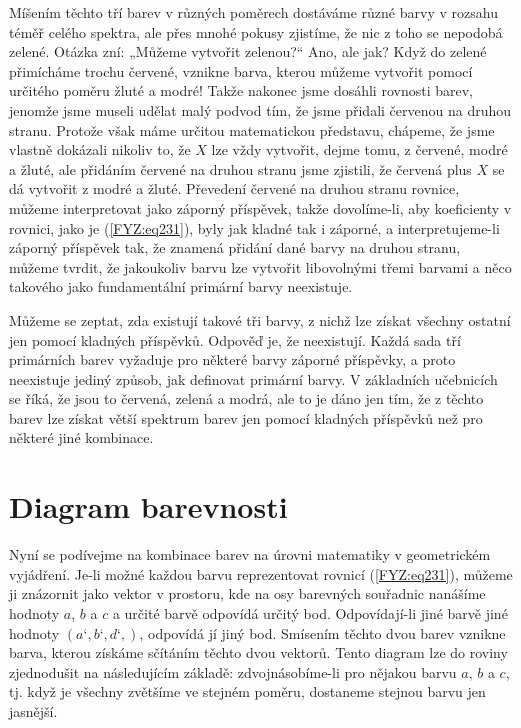     Míšením těchto tří barev v různých poměrech dostáváme různé barvy v rozsahu téměř celého 
    spektra, ale přes mnohé pokusy zjistíme, že nic z toho se nepodobá zelené. Otázka zní: „Můžeme 
    vytvořit zelenou?“ Ano, ale jak? Když do zelené přimícháme trochu červené, vznikne barva, 
    kterou můžeme vytvořit pomocí určitého poměru žluté a modré! Takže nakonec jsme dosáhli 
    rovnosti barev, jenomže jsme museli udělat malý podvod tím, že jsme přidali červenou na druhou 
    stranu. Protože však máme určitou matematickou představu, chápeme, že jsme vlastně dokázali 
    nikoliv to, že \(X\) lze vždy vytvořit, dejme tomu, z červené, modré a žluté, ale přidáním 
    červené na druhou stranu jsme zjistili, že červená plus \(X\) se dá vytvořit z modré a žluté. 
    Převedení červené na druhou stranu rovnice, můžeme interpretovat jako záporný příspěvek, takže 
    dovolíme-li, aby koeficienty v rovnici, jako je (\ref{FYZ:eq231}), byly jak kladné tak i 
    záporné, a interpretujeme-li záporný příspěvek tak, že znamená přidání dané barvy na druhou 
    stranu, můžeme tvrdit, že jakoukoliv barvu lze vytvořit libovolnými třemi barvami a něco 
    takového jako fundamentální primární barvy neexistuje.
    
    Můžeme se zeptat, zda existují takové tři barvy, z nichž lze získat všechny ostatní jen pomocí 
    kladných příspěvků. Odpověď je, že neexistují. Každá sada tří primárních barev vyžaduje pro 
    některé barvy záporné příspěvky, a proto neexistuje jediný způsob, jak definovat primární barvy.
    V základních učebnicích se říká, že jsou to červená, zelená a modrá, ale to je dáno jen tím, že 
    z těchto barev lze získat větší spektrum barev jen pomocí kladných příspěvků než pro některé 
    jiné kombinace.
    
  \section{Diagram barevnosti}\label{fyz:IchapXXXVsecIV}
    Nyní se podívejme na kombinace barev na úrovni matematiky v geometrickém vyjádření. Je-li možné 
    každou barvu reprezentovat rovnicí (\ref{FYZ:eq231}), můžeme ji znázornit jako vektor v 
    prostoru, kde na osy barevných souřadnic nanášíme hodnoty \(a\), \(b\) a \(c\) a určité barvě 
    odpovídá určitý bod. Odpovídají-li jiné barvě jiné hodnoty \((a‘, b‘, d‘,)\), odpovídá jí jiný 
    bod. Smísením těchto dvou barev vznikne barva, kterou získáme sčítáním těchto dvou vektorů. 
    Tento diagram lze do roviny zjednodušit na následujícím základě: zdvojnásobíme-li pro nějakou 
    barvu \(a\), \(b\) a \(c\), tj. když je všechny zvětšíme ve stejném poměru, dostaneme stejnou 
    barvu jen jasnější.
    
